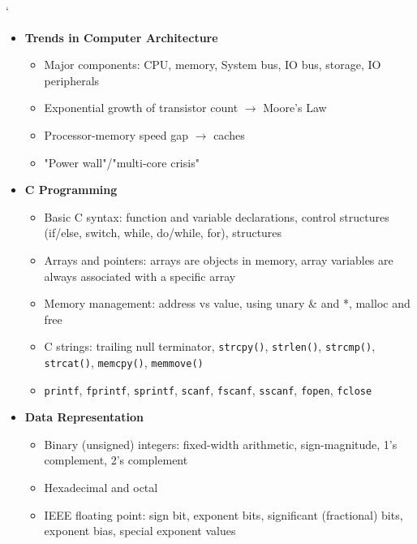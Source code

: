 `\documentclass[answers,12pt,addpoints]{exam}
\begin{document}
\begin{multicols}{2}
    \begin{itemize}
        \item \textbf{Trends in Computer Architecture}
        \begin{itemize}
            \item Major components: CPU, memory, System bus, IO bus, storage, IO peripherals
            \item Exponential growth of transistor count $\rightarrow$ Moore's Law
            \item Processor-memory speed gap $\rightarrow$ caches
            \item "Power wall"/"multi-core crisis"
        \end{itemize}
        
        \item \textbf{C Programming}
        \begin{itemize}
            \item Basic C syntax: function and variable declarations, control structures (if/else, switch, while, do/while, for), structures
            \item Arrays and pointers: arrays are objects in memory, array variables are always associated with a specific array
            \item Memory management: address vs value, using unary \& and *, malloc and free
            \item C strings: trailing null terminator, \texttt{strcpy()}, \texttt{strlen()}, \texttt{strcmp()}, \texttt{strcat()}, \texttt{memcpy()}, \texttt{memmove()}
            \item \texttt{printf}, \texttt{fprintf}, \texttt{sprintf}, \texttt{scanf}, \texttt{fscanf}, \texttt{sscanf}, \texttt{fopen}, \texttt{fclose}
        \end{itemize}
        
        \item \textbf{Data Representation}
        \begin{itemize}
            \item Binary (unsigned) integers: fixed-width arithmetic, sign-magnitude, 1's complement, 2's complement
            \item Hexadecimal and octal
            \item IEEE floating point: sign bit, exponent bits, significant (fractional) bits, exponent bias, special exponent values
        \end{itemize}
        

\end{itemize}
\end{multicols}
\end{document}
